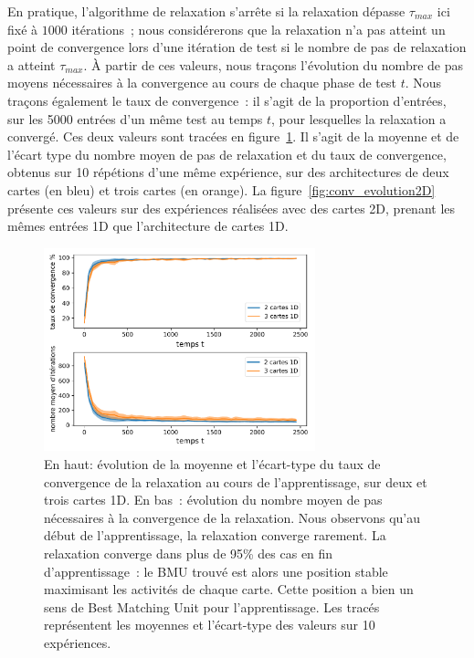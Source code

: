 \documentclass[../main]{subfiles}
\begin{document}
En pratique, l'algorithme de relaxation s'arrête si la relaxation dépasse $\tau_{max}$ ici fixé à $1000$ itérations~; nous considérerons que la relaxation n'a pas atteint un point de convergence lors d'une itération de test si le nombre de pas de relaxation a atteint $\tau_{max}$.
\`A partir de ces valeurs, nous traçons l'évolution du nombre de pas moyens nécessaires à la convergence au cours de chaque phase de test $t$.
Nous traçons également le taux de convergence~: il s'agit de la proportion d'entrées, sur les 5000 entrées d'un même test au temps $t$, pour lesquelles la relaxation a convergé.
Ces deux valeurs sont tracées en figure~\ref{fig:conv_evolution}. Il s'agit de la moyenne et de l'écart type du nombre moyen de pas de relaxation et du taux de convergence, obtenus sur 10 répétions d'une même expérience, sur des architectures de deux cartes (en bleu) et trois cartes (en orange).
La figure~\ref{fig:conv_evolution2D} présente ces valeurs sur des expériences réalisées avec des cartes 2D, prenant les mêmes entrées 1D que l'architecture de cartes 1D.

\begin{figure}
	\centering
	\includegraphics[width=0.7\textwidth]{1D_conv_evolution_total_french.pdf}
	\caption{En haut: évolution de la moyenne et l'écart-type du taux de convergence de la relaxation au cours de l'apprentissage, sur deux et trois cartes 1D. En bas~: évolution du nombre moyen de pas nécessaires à la convergence de la relaxation. Nous observons qu'au début de l'apprentissage, la relaxation converge rarement. La relaxation converge dans plus de 95\% des cas en fin d'apprentissage~: le BMU trouvé est alors une position stable maximisant les activités de chaque carte. Cette position a bien un sens de \og Best Matching Unit \fg{} pour l'apprentissage.
	Les tracés représentent les moyennes et l'écart-type des valeurs sur 10 expériences. \label{fig:conv_evolution}}
	\end{figure}
\end{document}
